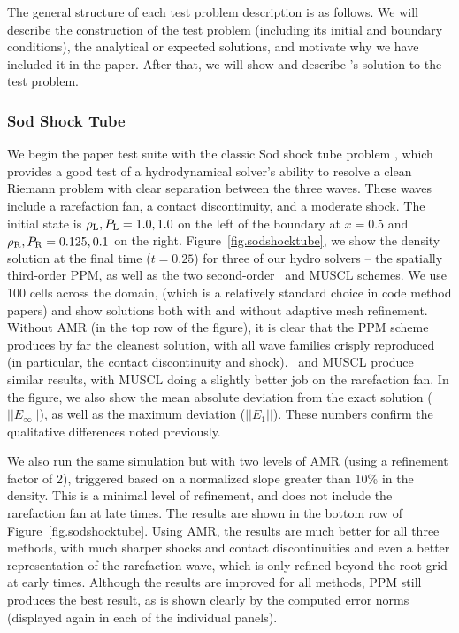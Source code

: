 The general structure of each test problem description is as follows.
We will describe the construction of the test problem (including its
initial and boundary conditions), the analytical or expected
solutions, and motivate why we have included it in the paper.  After
that, we will show and describe \enzo's solution to the test problem.


\subsubsection{Sod Shock Tube}
\label{sec.tests.sodshock}

We begin the paper test suite with the classic Sod shock tube problem
\citep{Sod78}, which provides a good test of a hydrodynamical solver's
ability to resolve a clean Riemann problem with clear separation
between the three waves.  These waves include a rarefaction fan, a
contact discontinuity, and a moderate shock.  The initial state is 
$\rho_{\rm L}, P_{\rm L} = 1.0, 1.0$ on the left of the boundary at 
$x=0.5$ and $\rho_{\rm R}, P_{\rm R} = 0.125, 0.1$ on the right.
Figure~\ref{fig.sodshocktube}, we show the density solution at the
final time ($t=0.25$) for three of our hydro solvers -- the spatially third-order
PPM, as well as the two second-order \zeus\ and MUSCL schemes.  We use
100 cells across the domain, (which is a relatively standard choice in
code method papers) and show solutions both with and without adaptive
mesh refinement.  Without AMR (in the top row of the figure), it is
clear that the PPM scheme produces by far the cleanest solution, with
all wave families crisply reproduced (in particular, the contact
discontinuity and shock).  \zeus\ and MUSCL produce similar results,
with MUSCL doing a slightly better job on the rarefaction fan.  In the
figure, we also show the mean absolute deviation from the exact
solution ($||E_\infty||$), as well as the maximum deviation
($||E_1||$).  These numbers confirm the qualitative differences noted
previously.

We also run the same simulation but with two levels of AMR (using a
refinement factor of 2), triggered based on a normalized slope greater
than 10\% in the density.  This is a minimal level of refinement, and
does not include the rarefaction fan at late times.  The results are
shown in the bottom row of Figure~\ref{fig.sodshocktube}.  Using AMR,
the results are much better for all three methods, with much sharper
shocks and contact discontinuities and even a better representation of
the rarefaction wave, which is only refined beyond the root grid at
early times.  Although the results are improved for all methods, PPM
still produces the best result, as is shown clearly by the computed
error norms (displayed again in each of the individual panels).

